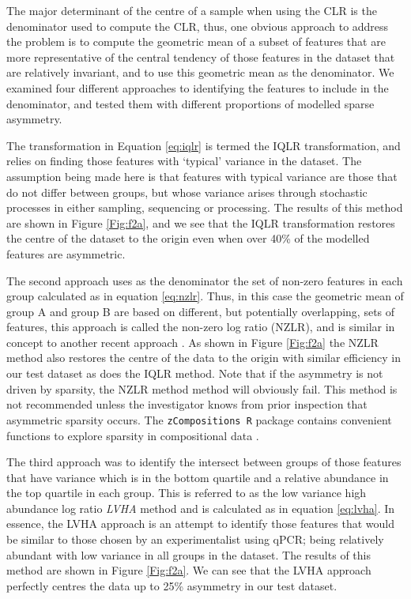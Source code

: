\documentclass[graybox]{svmult}
\begin{document}
The major determinant of the centre of a sample when using the CLR is the denominator used to compute the CLR, thus, one obvious approach to address the problem is to compute the geometric mean of a subset of features that are more representative of the central tendency of those features in the dataset that are relatively invariant, and to use this geometric mean as the denominator. We  examined four different approaches to identifying the features to include in the denominator, and tested them with different proportions of modelled sparse asymmetry.

The transformation in Equation \ref{eq:iqlr} is termed the IQLR transformation, and relies on finding those features with `typical' variance in the dataset. The assumption being made here is that features with typical variance are those that do not differ between groups, but whose variance arises through stochastic processes in either sampling, sequencing or processing. The results of this method are shown in Figure \ref{Fig:f2a}, and we see that the IQLR transformation restores the centre of the dataset to the origin even when over 40\% of the modelled features are asymmetric.

The second approach uses as the denominator the set of non-zero features in each group calculated as in equation \ref{eq:nzlr}.  Thus, in this case the geometric mean of group A and group B are based on different, but potentially overlapping, sets of features, this approach is called the non-zero log ratio (NZLR), and is similar in concept to another recent approach \cite{Martino:2019aa}. As shown in Figure \ref{Fig:f2a} the NZLR method also restores the centre of the data to the origin with similar efficiency in our test dataset as does the IQLR method. Note that if the asymmetry is not driven by sparsity, the NZLR method method will obviously fail. This method is not recommended unless the investigator knows from prior inspection  that asymmetric sparsity occurs.   The \texttt{zCompositions R} package contains convenient functions to explore sparsity in compositional data \cite{PalareaAlbaladejo201585}.

The third approach was to identify the intersect between groups of those features that have variance which is in the bottom quartile  and a relative abundance in the top quartile in each group. This is referred to as the low variance high abundance log ratio  \textit{LVHA} method and is calculated as in equation \ref{eq:lvha}. In essence, the LVHA approach is an attempt to identify those features that would be similar to those chosen by an experimentalist using qPCR; being relatively abundant with low variance in all groups in the dataset.  The results of this method are shown in Figure \ref{Fig:f2a}. We can see that the LVHA approach perfectly centres the data up to 25\% asymmetry in our test dataset.  
\end{document}

